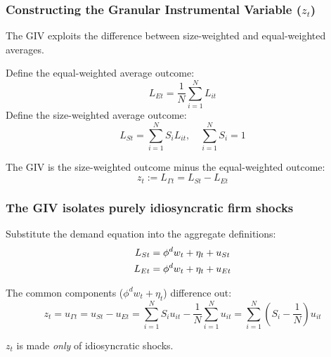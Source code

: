 \documentclass[aspectratio=169,11pt]{beamer}
\begin{document}




\begin{frame}
    \frametitle{Constructing the Granular Instrumental Variable ($z_t$)}

    {
        The GIV exploits the difference between size-weighted and equal-weighted averages.
    }

    \vspace{0.2cm}
    Define the equal-weighted average outcome:
    \begin{equation*}
        L_{Et} = \frac{1}{N} \sum_{i=1}^N L_{it} \tag{Equal-Weighted Average}
    \end{equation*}
    Define the size-weighted average outcome:
    \begin{equation*}
        L_{St} = \sum_{i=1}^N S_i L_{it}, \quad \sum_{i=1}^N S_i = 1 \tag{Size-Weighted Average}
    \end{equation*}

    \vspace{0.5cm}
    The GIV is the size-weighted outcome minus the equal-weighted outcome:
    \begin{equation}
        z_t := L_{\Gamma t} = L_{St} - L_{Et} \tag{GIV}
    \end{equation}

\end{frame}

\begin{frame}[label=src_equal_weighted]
    \frametitle{The GIV isolates purely idiosyncratic firm shocks}

    \vspace{0.5cm}
    Substitute the demand equation into the aggregate definitions: \hyperlink{app_size_weighted}{}
    \begin{align}
        L_{St} & = \phi^d w_t + \eta_t + u_{St} \notag \\
        L_{Et} & = \phi^d w_t + \eta_t + u_{Et} \notag
    \end{align}

    \vspace{0.5cm}
    The common components ($\phi^d w_t + \eta_t$) difference out:
    \begin{equation}
        z_t = u_{\Gamma t} = u_{St} - u_{Et} = \sum_{i=1}^N S_i u_{it} - \frac{1}{N} \sum_{i=1}^N u_{it} = \sum_{i=1}^N (S_i - \frac{1}{N}) u_{it} \tag{GIV}
    \end{equation}

    \vspace{0.5cm}
    {\Large
        $z_t$ is made \emph{only} of idiosyncratic shocks.
    }

\end{frame}
\end{document}
